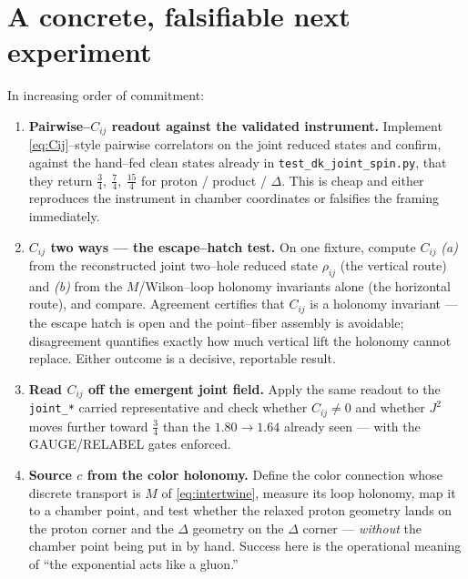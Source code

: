 \documentclass[11pt,oneside]{article}
\newcommand{\code}[1]{\texttt{#1}}
\theoremstyle{plain}
\begin{document}
\section{A concrete, falsifiable next experiment}
\label{sec:program}

In increasing order of commitment:
\begin{enumerate}[leftmargin=2em]
  \item \textbf{Pairwise--$C_{ij}$ readout against the validated instrument.}
        Implement \eqref{eq:Cij}--style pairwise correlators on the joint reduced
        states and confirm, against the hand--fed clean states already in
        \code{test\_dk\_joint\_spin.py}, that they return
        $\tfrac34,\ \tfrac74,\ \tfrac{15}{4}$ for proton / product / $\Delta$.
        This is cheap and either reproduces the instrument in chamber coordinates
        or falsifies the framing immediately.
  \item \textbf{$C_{ij}$ two ways --- the escape--hatch test.} On one fixture,
        compute $C_{ij}$ \emph{(a)} from the reconstructed joint two--hole reduced
        state $\rho_{ij}$ (the vertical route) and \emph{(b)} from the
        $M$/Wilson--loop holonomy invariants alone (the horizontal route), and
        compare. Agreement certifies that $C_{ij}$ is a holonomy invariant --- the
        escape hatch is open and the point--fiber assembly is avoidable;
        disagreement quantifies exactly how much vertical lift the holonomy cannot
        replace. Either outcome is a decisive, reportable result.
  \item \textbf{Read $C_{ij}$ off the emergent joint field.} Apply the same
        readout to the \code{joint\_*} carried representative and check whether
        $C_{ij}\ne0$ and whether $J^2$ moves further toward $\tfrac34$ than the
        $1.80\!\to\!1.64$ already seen --- with the GAUGE/RELABEL gates enforced.
  \item \textbf{Source $c$ from the color holonomy.} Define the color connection
        whose discrete transport is $M$ of \eqref{eq:intertwine}, measure its
        loop holonomy, map it to a chamber point, and test whether the relaxed
        proton geometry lands on the proton corner and the $\Delta$ geometry on
        the $\Delta$ corner --- \emph{without} the chamber point being put in by
        hand. Success here is the operational meaning of ``the exponential acts
        like a gluon.''
\end{enumerate}
\end{document}
